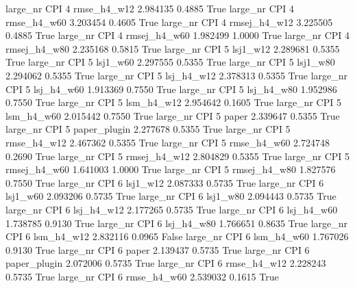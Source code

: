   large_nr      CPI                 4  rmse_h4_w12    2.984135      0.4885    True
  large_nr      CPI                 4  rmse_h4_w60    3.203454      0.4605    True
  large_nr      CPI                 4 rmsej_h4_w12    3.225505      0.4885    True
  large_nr      CPI                 4 rmsej_h4_w60    1.982499      1.0000    True
  large_nr      CPI                 4 rmsej_h4_w80    2.235168      0.5815    True
  large_nr      CPI                 5     lsj1_w12    2.289681      0.5355    True
  large_nr      CPI                 5     lsj1_w60    2.297555      0.5355    True
  large_nr      CPI                 5     lsj1_w80    2.294062      0.5355    True
  large_nr      CPI                 5   lsj_h4_w12    2.378313      0.5355    True
  large_nr      CPI                 5   lsj_h4_w60    1.913369      0.7550    True
  large_nr      CPI                 5   lsj_h4_w80    1.952986      0.7550    True
  large_nr      CPI                 5   lsm_h4_w12    2.954642      0.1605    True
  large_nr      CPI                 5   lsm_h4_w60    2.015442      0.7550    True
  large_nr      CPI                 5        paper    2.339647      0.5355    True
  large_nr      CPI                 5 paper_plugin    2.277678      0.5355    True
  large_nr      CPI                 5  rmse_h4_w12    2.467362      0.5355    True
  large_nr      CPI                 5  rmse_h4_w60    2.724748      0.2690    True
  large_nr      CPI                 5 rmsej_h4_w12    2.804829      0.5355    True
  large_nr      CPI                 5 rmsej_h4_w60    1.641003      1.0000    True
  large_nr      CPI                 5 rmsej_h4_w80    1.827576      0.7550    True
  large_nr      CPI                 6     lsj1_w12    2.087333      0.5735    True
  large_nr      CPI                 6     lsj1_w60    2.093206      0.5735    True
  large_nr      CPI                 6     lsj1_w80    2.094443      0.5735    True
  large_nr      CPI                 6   lsj_h4_w12    2.177265      0.5735    True
  large_nr      CPI                 6   lsj_h4_w60    1.738785      0.9130    True
  large_nr      CPI                 6   lsj_h4_w80    1.766651      0.8635    True
  large_nr      CPI                 6   lsm_h4_w12    2.832116      0.0965   False
  large_nr      CPI                 6   lsm_h4_w60    1.767026      0.9130    True
  large_nr      CPI                 6        paper    2.139437      0.5735    True
  large_nr      CPI                 6 paper_plugin    2.072006      0.5735    True
  large_nr      CPI                 6  rmse_h4_w12    2.228243      0.5735    True
  large_nr      CPI                 6  rmse_h4_w60    2.539032      0.1615    True
